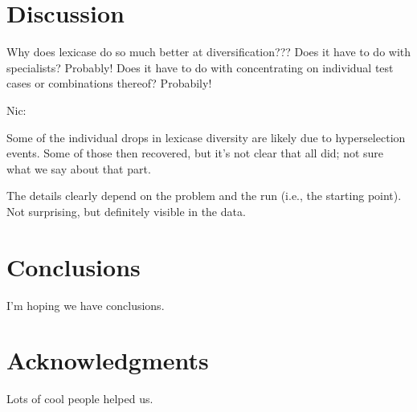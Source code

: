 \documentclass{sig-alternate-05-2015}
\begin{document}
\section{Discussion}

Why does lexicase do so much better at diversification??? Does it have to do with specialists? Probably! Does it have to do with concentrating on individual test cases or combinations thereof? Probabily!

Nic:

    Some of the individual drops in lexicase diversity are likely due to hyperselection events. Some of those then recovered, but it's not clear that all did; not sure what we say about that part.

    The details clearly depend on the problem and the run (i.e., the starting point). Not surprising, but definitely visible in the data.



\section{Conclusions}
\label{sec:conclusions}

I'm hoping we have conclusions.

\section*{Acknowledgments}
Lots of cool people helped us.


%
%


\end{document}

